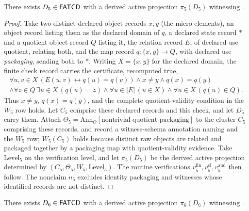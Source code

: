\begin{proposition}\label{prop:p5-witness}
There exists \(D_5 \in \mathsf{FATCD}{}\) with a derived active projection
\(\pi_5(D_5)\) witnessing \Pfive{}.
\end{proposition}

\begin{proof}
Take two distinct declared object records \(x,y\) (the micro-elements), an object record
listing them as the declared domain of \(q\), a declared state record \(*\) and a
quotient object record \(Q\) listing it, the relation record \(E\), of declared use
quotient, relating both, and the map record \(q:\{x,y\}\to Q\), with declared use \emph{packaging}, sending both to \(*\). Writing \(X=\{x,y\}\) for the declared domain, the finite check
record carries the certificate, recomputed true,
\begin{multline*}\forall u,v\in X\,(E(u,v)\leftrightarrow q(u)=q(v))\wedge x\ne y\wedge q(x)=q(y)\\ \wedge\forall z\in Q\,\exists u\in X\,(q(u)=z)\wedge\forall u\in|E|\,(u\in X)\wedge\forall u\in X\,(q(u)\in Q).\end{multline*} Thus
\(x\ne y\), \(q(x)=q(y)\), and the complete quotient-validity condition in the
\(W_5\) row holds. Let \(C_5\) comprise these declared records and this check,
and let \(D_5\) carry them. Attach
\(\Theta_5 = \mathrm{Ann}_\Theta[\text{nontrivial quotient packaging}]\)
to the cluster \(C_5\) comprising these records, and record a
witness-schema annotation naming \Pfive{} and the \(W_5\) row; \(W_5(C_5)\)
holds because distinct raw objects are related and packaged together by a
packaging map with quotient-validity evidence. Take
\(\mathrm{Level}_5\) on the verification level, and let \(\pi_5(D_5)\)
be the derived active projection determined by
\((C_5,\Theta_5,W_5,\mathrm{Level}_5)\). The routine verifications
\(v_5^{\mathrm{fin}}, v_5^{\mathrm{cl}}, v_5^{\mathrm{aud}}\) then
follow. The nonclaim \(n_5\) excludes identity packaging and
witnesses whose identified records are not distinct.
\end{proof}

\begin{proposition}\label{prop:p6-witness}
There exists \(D_6 \in \mathsf{FATCD}{}\) with a derived active projection
\(\pi_6(D_6)\) witnessing \Psix{}.
\end{proposition}


